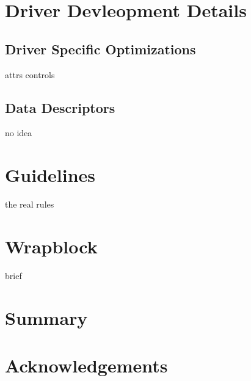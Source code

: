 \documentclass[11pt]{article}
\begin{document}
\section{Driver Devleopment Details}

\subsection{Driver Specific Optimizations}
attrs
controls

\subsection{Data Descriptors}
no idea

\section{Guidelines}
the real rules

\section{Wrapblock}
brief

\section{Summary}

\section*{Acknowledgements}
\end{document}
